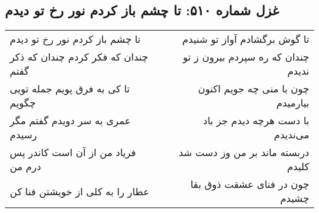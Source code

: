 \begin{center}
\section*{غزل شماره ۵۱۰: تا چشم باز کردم نور رخ تو دیدم}
\label{sec:510}
\begin{longtable}{l p{0.5cm} r}
تا چشم باز کردم نور رخ تو دیدم
&&
تا گوش برگشادم آواز تو شنیدم
\\
چندان که فکر کردم چندان که ذکر گفتم
&&
چندان که ره سپردم بیرون ز تو ندیدم
\\
تا کی به فرق پویم جمله تویی چگویم
&&
چون با منی چه جویم اکنون بیارمیدم
\\
عمری به سر دویدم گفتم مگر رسیدم
&&
با دست هرچه دیدم جز باد می‌ندیدم
\\
فریاد من از آن است کاندر پس درم من
&&
دربسته ماند بر من وز دست شد کلیدم
\\
عطار را به کلی از خویشتن فنا کن
&&
چون در فنای عشقت ذوق بقا چشیدم
\\
\end{longtable}
\end{center}
